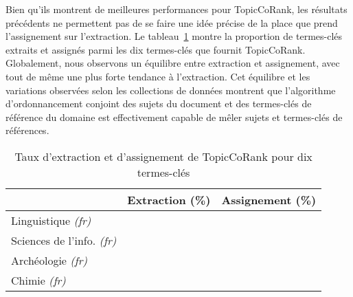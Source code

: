         Bien qu'ils montrent de meilleures performances pour TopicCoRank, les
        résultats précédents ne permettent pas de se faire une idée précise de
        la place que prend l'assignement sur l'extraction. Le
        tableau~\ref{tab:assignment_ratio} montre la proportion de termes-clés
        extraits et assignés parmi les dix termes-clés que fournit TopicCoRank.
        Globalement, nous observons un équilibre entre extraction et
        assignement, avec tout de même une plus forte tendance à l'extraction.
        Cet équilibre et les variations observées selon les collections de
        données montrent que l'algorithme d'ordonnancement conjoint des sujets
        du document et des termes-clés de référence du domaine est effectivement
        capable de mêler sujets et termes-clés de références.
        \begin{table}[!h]
          \centering
          \begin{tabular}{l|c|c}
              \toprule
              & Extraction (\%) & Assignement (\%)\\
              \hline
              Linguistique \textit{(fr)} & & \\
              Sciences de l'info. \textit{(fr)} & & \\
              Archéologie \textit{(fr)} & & \\
              Chimie \textit{(fr)} & & \\
              \bottomrule
          \end{tabular}
          \caption{Taux d'extraction et d'assignement de TopicCoRank pour dix
                   termes-clés
                   \label{tab:assignment_ratio}}
        \end{table}

